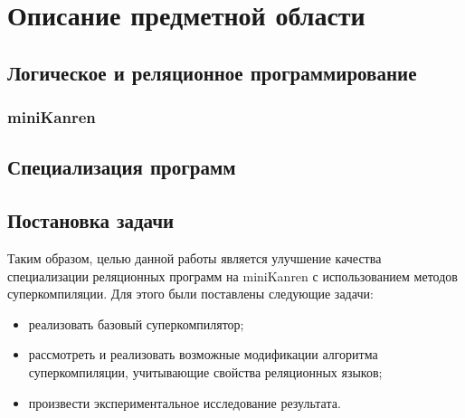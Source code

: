 \section{Описание предметной области}

\subsection{Логическое и реляционное программирование}





\subsubsection{miniKanren}



\subsection{Специализация программ}



\subsection{Постановка задачи}

Таким образом, целью данной работы является улучшение качества специализации
реляционных программ на miniKanren с использованием методов суперкомпиляции.
Для этого были поставлены следующие задачи:
\begin{itemize}
\item реализовать базовый суперкомпилятор;
\item рассмотреть и реализовать возможные модификации алгоритма суперкомпиляции,
      учитывающие свойства реляционных языков;
\item произвести экспериментальное исследование результата.
\end{itemize}

